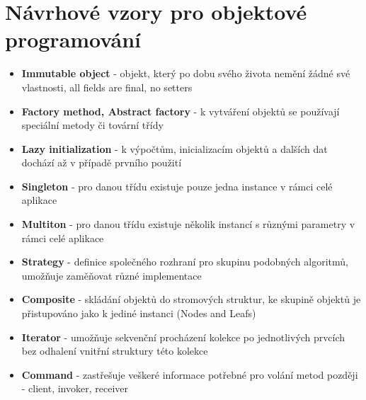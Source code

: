 \documentclass{scrreprt}
\begin{document}
\section{Návrhové vzory pro objektové programování}
\begin{itemize}
\item \textbf{Immutable object} - objekt, který po dobu svého života nemění žádné své vlastnosti, all fields are final, no setters
\item \textbf{Factory method, Abstract factory} - k vytváření objektů se používají speciální metody či tovární třídy
\item \textbf{Lazy initialization} - k výpočtům, inicializacím objektů a dalších dat dochází až v případě prvního použití
\item \textbf{Singleton} - pro danou třídu existuje pouze jedna instance v rámci celé aplikace
\item \textbf{Multiton} - pro danou třídu existuje několik instancí s různými parametry v rámci celé aplikace
\item \textbf{Strategy} - definice společného rozhraní pro skupinu podobných algoritmů, umožňuje zaměňovat různé implementace
\item \textbf{Composite} - skládání objektů do stromových struktur, ke skupině objektů je přistupováno jako k jediné instanci (Nodes and Leafs)
\item \textbf{Iterator} - umožňuje sekvenční procházení kolekce po jednotlivých prvcích bez odhalení vnitřní struktury této kolekce
\item \textbf{Command} - zastřešuje veškeré informace potřebné pro volání metod později - client, invoker, receiver
\end{itemize}
\end{document}
